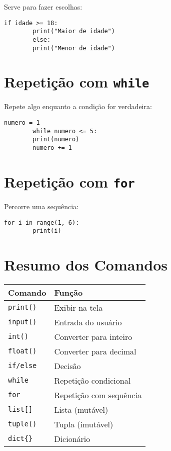 \documentclass[12pt]{article}
\begin{document}
	Serve para fazer escolhas:
	
	\begin{lstlisting}[style=pythonstyle]
		if idade >= 18:
		print("Maior de idade")
		else:
		print("Menor de idade")
	\end{lstlisting}
	
	\section{Repetição com \texttt{while}}
	
	Repete algo enquanto a condição for verdadeira:
	
	\begin{lstlisting}[style=pythonstyle]
		numero = 1
		while numero <= 5:
		print(numero)
		numero += 1
	\end{lstlisting}
	
	\section{Repetição com \texttt{for}}
	
	Percorre uma sequência:
	
	\begin{lstlisting}[style=pythonstyle]
		for i in range(1, 6):
		print(i)
	\end{lstlisting}
	
	\section{Resumo dos Comandos}
	
	\begin{tabular}{|l|l|}
		\hline
		\textbf{Comando} & \textbf{Função} \\
		\hline
		\texttt{print()} & Exibir na tela \\
		\texttt{input()} & Entrada do usuário \\
		\texttt{int()}   & Converter para inteiro \\
		\texttt{float()} & Converter para decimal \\
		\texttt{if/else} & Decisão \\
		\texttt{while}   & Repetição condicional \\
		\texttt{for}     & Repetição com sequência \\
		\texttt{list[]}  & Lista (mutável) \\
		\texttt{tuple()} & Tupla (imutável) \\
		\texttt{dict\{\}}& Dicionário \\
		\hline
	\end{tabular}
	
\end{document}
